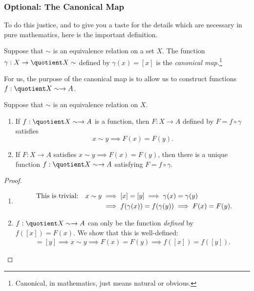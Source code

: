 \subsubsection*{\bf Optional: The Canonical Map}

To do this justice, and to give you a taste for the details which are necessary in pure mathematics, here is the important definition.

\begin{defn}
Suppose that $\sim$ is an equivalence relation on a set $X$. The function $\gamma:X\to \quotient X\sim$ defined by $\gamma(x)=[x]$ is the \emph{canonical map.}\footnote{Canonical, in mathematics, just means natural or obvious.}
\end{defn}

\noindent For us, the purpose of the canonical map is to allow us to construct functions $f:\quotient X\sim\to A$.

\begin{thm}
Suppose that $\sim$ is an equivalence relation on $X$.
\begin{enumerate}
  \item If $f:\quotient X\sim\to A$ is a function, then $F:X\to A$ defined by $F=f\circ\gamma$ satisfies
  \[x\sim y\implies F(x)=F(y).\]
  \item If $F:X\to A$ satisfies $x\sim y\implies F(x)=F(y)$, then there is a unique function $f:\quotient X\sim\to A$ satisfying $F=f\circ\gamma$.
\end{enumerate}
\end{thm}

\begin{proof}
\begin{enumerate}
  \item\preinitdisp\begin{align*}
	\hspace{4.3pt}\text{This is trivial:}\quad x\sim y&\implies [x]=[y]\implies \gamma(x)=\gamma(y)\\
	&\implies f(\gamma(x))=f(\gamma(y))\implies F(x)=F(y).
	\end{align*}\postinitdisp
	\item $f:\quotient X\sim\to A$ can only be the function \emph{defined} by $f([x])=F(x)$. We show that this is well-defined:
	\begin{gather*}
	[x]=[y]\implies x\sim y\implies F(x)=F(y)\implies f([x])=f([y]).\tag*{\qedhere}
	\end{gather*}
\end{enumerate}
\end{proof}

